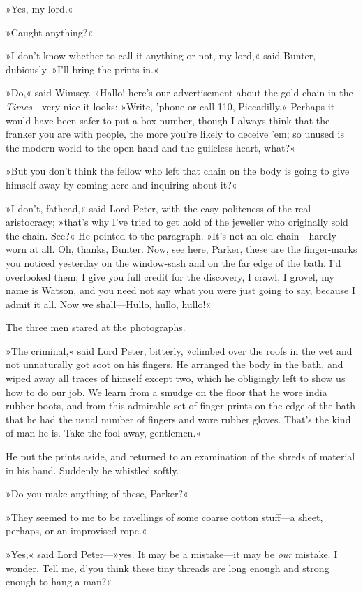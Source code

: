 »Yes, my lord.«

»Caught anything?«

»I don't know whether to call it anything or not, my lord,« said Bunter, dubiously. »I'll bring the prints in.«

»Do,« said Wimsey. »Hallo! here's our advertisement about the gold chain in the \textit{Times}---very nice it looks: »Write, 'phone or call 110, Piccadilly.« Perhaps it would have been safer to put a box number, though I always think that the franker you are with people, the more you're likely to deceive 'em; so unused is the modern world to the open hand and the guileless heart, what?«

»But you don't think the fellow who left that chain on the body is going to give himself away by coming here and inquiring about it?«

»I don't, fathead,« said Lord Peter, with the easy politeness of the real aristocracy; »that's why I've tried to get hold of the jeweller who originally sold the chain. See?« He pointed to the paragraph. »It's not an old chain—hardly worn at all. Oh, thanks, Bunter. Now, see here, Parker, these are the finger-marks you noticed yesterday on the window-sash and on the far edge of the bath. I'd overlooked them; I give you full credit for the discovery, I crawl, I grovel, my name is Watson, and you need not say what you were just going to say, because I admit it all. Now we shall—Hullo, hullo, hullo!«

The three men stared at the photographs.

»The criminal,« said Lord Peter, bitterly, »climbed over the roofs in the wet and not unnaturally got soot on his fingers. He arranged the body in the bath, and wiped away all traces of himself except two, which he obligingly left to show us how to do our job. We learn from a smudge on the floor that he wore india rubber boots, and from this admirable set of finger-prints on the edge of the bath that he had the usual number of fingers and wore rubber gloves. That's the kind of man he is. Take the fool away, gentlemen.«

He put the prints aside, and returned to an examination of the shreds of material in his hand. Suddenly he whistled softly.

»Do you make anything of these, Parker?«

»They seemed to me to be ravellings of some coarse cotton stuff—a sheet, perhaps, or an improvised rope.«

»Yes,« said Lord Peter---»yes. It may be a mistake—it may be \textit{our} mistake. I wonder. Tell me, d'you think these tiny threads are long enough and strong enough to hang a man?«

